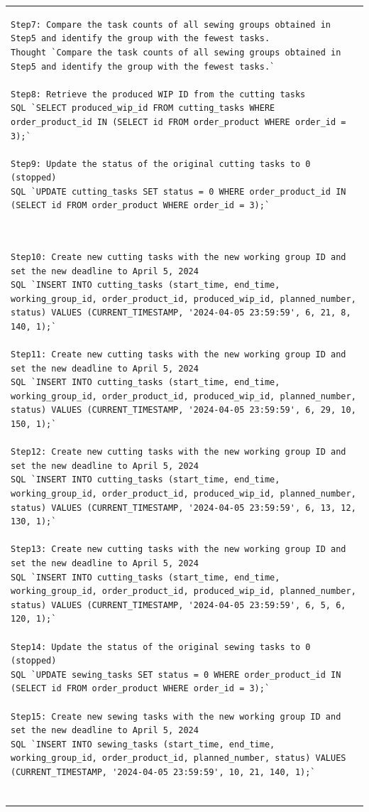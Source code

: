 \documentclass[preprint,12pt]{elsarticle}
\begin{document}
\begin{center}
\begin{longtable}{p{390pt}}
\begin{lstlisting}[style=my_operation, label={lst:chain_of_operation}]
Step7: Compare the task counts of all sewing groups obtained in Step5 and identify the group with the fewest tasks.
Thought `Compare the task counts of all sewing groups obtained in Step5 and identify the group with the fewest tasks.`

Step8: Retrieve the produced WIP ID from the cutting tasks
SQL `SELECT produced_wip_id FROM cutting_tasks WHERE order_product_id IN (SELECT id FROM order_product WHERE order_id = 3);`

Step9: Update the status of the original cutting tasks to 0 (stopped)
SQL `UPDATE cutting_tasks SET status = 0 WHERE order_product_id IN (SELECT id FROM order_product WHERE order_id = 3);`
\end{lstlisting}\\
\begin{lstlisting}[style=my_operation, label={lst:chain_of_operation}]

Step10: Create new cutting tasks with the new working group ID and set the new deadline to April 5, 2024
SQL `INSERT INTO cutting_tasks (start_time, end_time, working_group_id, order_product_id, produced_wip_id, planned_number, status) VALUES (CURRENT_TIMESTAMP, '2024-04-05 23:59:59', 6, 21, 8, 140, 1);`

Step11: Create new cutting tasks with the new working group ID and set the new deadline to April 5, 2024
SQL `INSERT INTO cutting_tasks (start_time, end_time, working_group_id, order_product_id, produced_wip_id, planned_number, status) VALUES (CURRENT_TIMESTAMP, '2024-04-05 23:59:59', 6, 29, 10, 150, 1);`

Step12: Create new cutting tasks with the new working group ID and set the new deadline to April 5, 2024
SQL `INSERT INTO cutting_tasks (start_time, end_time, working_group_id, order_product_id, produced_wip_id, planned_number, status) VALUES (CURRENT_TIMESTAMP, '2024-04-05 23:59:59', 6, 13, 12, 130, 1);`

Step13: Create new cutting tasks with the new working group ID and set the new deadline to April 5, 2024
SQL `INSERT INTO cutting_tasks (start_time, end_time, working_group_id, order_product_id, produced_wip_id, planned_number, status) VALUES (CURRENT_TIMESTAMP, '2024-04-05 23:59:59', 6, 5, 6, 120, 1);`

Step14: Update the status of the original sewing tasks to 0 (stopped)
SQL `UPDATE sewing_tasks SET status = 0 WHERE order_product_id IN (SELECT id FROM order_product WHERE order_id = 3);`

Step15: Create new sewing tasks with the new working group ID and set the new deadline to April 5, 2024
SQL `INSERT INTO sewing_tasks (start_time, end_time, working_group_id, order_product_id, planned_number, status) VALUES (CURRENT_TIMESTAMP, '2024-04-05 23:59:59', 10, 21, 140, 1);`


\end{lstlisting}
\end{longtable}
\end{center}
\end{document}
